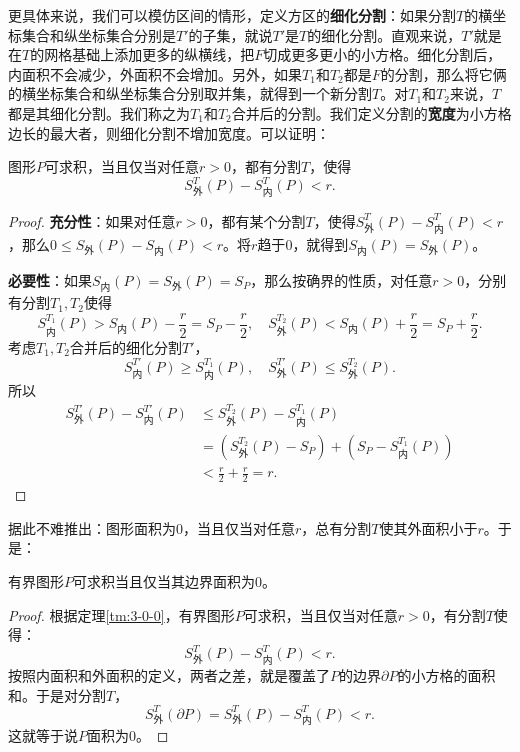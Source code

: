 \documentclass[12pt,UTF8,fontset=none]{ctexbook}
\begin{document}
更具体来说，我们可以模仿区间的情形，定义方区的\textbf{细化分割}：如果分割$T$的横坐标集合和纵坐标集合分别是$T'$的子集，就说$T'$是$T$的细化分割。直观来说，$T'$就是在$T$的网格基础上添加更多的纵横线，把$F$切成更多更小的小方格。细化分割后，内面积不会减少，外面积不会增加。另外，如果$T_1$和$T_2$都是$F$的分割，那么将它俩的横坐标集合和纵坐标集合分别取并集，就得到一个新分割$T$。对$T_1$和$T_2$来说，$T$都是其细化分割。我们称之为$T_1$和$T_2$合并后的分割。我们定义分割的\textbf{宽度}为小方格边长的最大者，则细化分割不增加宽度。可以证明：
\begin{tm}\label{tm:3-0-0}
    图形$P$可求积，当且仅当对任意$r>0$，都有分割$T$，使得
    $$ S_{\text{外}}^T(P) - S_{\text{内}}^T(P) < r.$$
\end{tm}
\begin{proof}
    \textbf{充分性}：如果对任意$r>0$，都有某个分割$T$，使得$S_{\text{外}}^T(P) - S_{\text{内}}^T(P) < r$，那么$0\leqslant S_{\text{外}} (P) - S_{\text{内}}(P) < r$。将$r$趋于$0$，就得到$S_{\text{内}} (P) = S_{\text{外}} (P)$。

    \textbf{必要性}：如果$S_{\text{内}} (P) = S_{\text{外}} (P) = S_P$，那么按确界的性质，对任意$r>0$，分别有分割$T_1,T_2$使得
    $$ S_{\text{内}}^{T_1}(P) > S_{\text{内}} (P)  - \frac{r}{2} = S_P - \frac{r}{2}, \quad S_{\text{外}}^{T_2}(P) < S_{\text{内}} (P)  + \frac{r}{2} = S_P + \frac{r}{2}. $$
    考虑$T_1,T_2$合并后的细化分割$T'$，
    $$ S_{\text{内}}^{T'}(P) \geqslant S_{\text{内}}^{T_1}(P), \quad S_{\text{外}}^{T'}(P) \leqslant S_{\text{外}}^{T_2}(P). $$
    所以
    \begin{align*}
        S_{\text{外}}^{T'}(P) - S_{\text{内}}^{T'}(P)&\leqslant S_{\text{外}}^{T_2}(P) - S_{\text{内}}^{T_1}(P) \\
        &= \left(S_{\text{外}}^{T_2}(P) - S_P\right) + \left(S_P - S_{\text{内}}^{T_1}(P)\right) \\
        &< \frac{r}{2} + \frac{r}{2} = r.
    \end{align*}
\end{proof}

据此不难推出：图形面积为$0$，当且仅当对任意$r$，总有分割$T$使其外面积小于$r$。于是：
\begin{tm}\label{tm:3-0-10}
    有界图形$P$可求积当且仅当其边界面积为$0$。
\end{tm}
\begin{proof}
    根据定理\ref{tm:3-0-0}，有界图形$P$可求积，当且仅当对任意$r>0$，有分割$T$使得：
    $$ S_{\text{外}}^T(P) - S_{\text{内}}^T(P) < r.$$
    按照内面积和外面积的定义，两者之差，就是覆盖了$P$的边界$\partial P$的小方格的面积和。于是对分割$T$，
    $$S_{\text{外}}^T(\partial P) = S_{\text{外}}^T(P) - S_{\text{内}}^T(P) < r.$$
    这就等于说$P$面积为$0$。
\end{proof}
\end{document}
